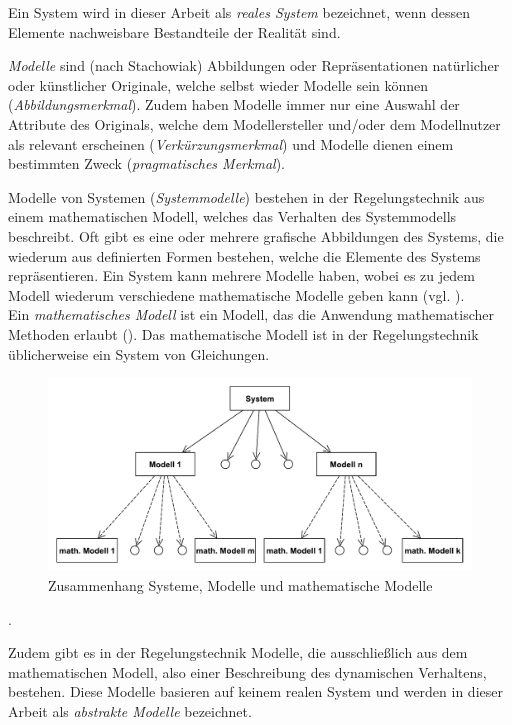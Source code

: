 Ein System wird in dieser Arbeit als \textit{reales System} bezeichnet, wenn dessen Elemente nachweisbare Bestandteile der Realität sind.

\textit{Modelle} sind (nach Stachowiak\cite[S. 13ff]{STA73}) Abbildungen oder Repräsentationen natürlicher oder künstlicher Originale, welche selbst wieder Modelle sein können (\textit{Abbildungsmerkmal}). Zudem haben Modelle immer nur eine Auswahl der Attribute des Originals, welche dem Modellersteller und/oder dem Modellnutzer als relevant erscheinen (\textit{Verkürzungsmerkmal}) und Modelle dienen einem bestimmten Zweck (\textit{pragmatisches Merkmal}). 

Modelle von Systemen (\textit{Systemmodelle}) bestehen in der Regelungstechnik aus einem mathematischen Modell, welches das Verhalten des Systemmodells beschreibt. Oft gibt es eine oder mehrere grafische Abbildungen des Systems, die wiederum aus definierten Formen bestehen, welche die Elemente des Systems repräsentieren. Ein System kann mehrere Modelle haben, wobei es zu jedem Modell wiederum verschiedene mathematische Modelle geben kann (vgl. \cite[Abschnitt 2.1]{LUD95} ).\\
Ein \textit{mathematisches Modell} ist ein Modell, das die Anwendung mathematischer Methoden erlaubt (\cite[S.9]{GRVO16}). Das mathematische Modell ist in der Regelungstechnik üblicherweise ein System von Gleichungen. 

\begin{figure}[H]
	\centering
	\includegraphics[width=0.9\linewidth]{Systeme_Modelle_Math_Beschreibung}
	\caption{Zusammenhang Systeme, Modelle und mathematische Modelle\protect\footnotemark}
	\label{fig:SysModelleSkizze}
\end{figure}
.

Zudem gibt es in der Regelungstechnik Modelle, die ausschließlich aus dem mathematischen Modell, also einer Beschreibung des dynamischen Verhaltens, bestehen. Diese Modelle basieren auf keinem realen System und werden in dieser Arbeit als \textit{abstrakte Modelle} bezeichnet. %

